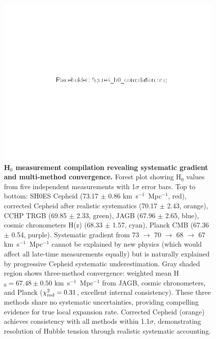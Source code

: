 \documentclass[twocolumn, linenumbers]{aastex701}
\begin{document}
\begin{figure}
\includegraphics[width=\columnwidth]{../figures/figure4_h0_compilation.png}
\caption{\textbf{H$_0$ measurement compilation revealing systematic gradient and multi-method convergence.} Forest plot showing H$_0$ values from five independent measurements with 1$\sigma$ error bars. Top to bottom: SH0ES Cepheid (73.17 $\pm$ 0.86 km~s$^{-1}$~Mpc$^{-1}$, red), corrected Cepheid after realistic systematics (70.17 $\pm$ 2.43, orange), CCHP TRGB (69.85 $\pm$ 2.33, green), JAGB (67.96 $\pm$ 2.65, blue), cosmic chronometers H(z) (68.33 $\pm$ 1.57, cyan), Planck CMB (67.36 $\pm$ 0.54, purple). Systematic gradient from 73 $\rightarrow$ 70 $\rightarrow$ 68 $\rightarrow$ 67 km~s$^{-1}$~Mpc$^{-1}$ cannot be explained by new physics (which would affect all late-time measurements equally) but is naturally explained by progressive Cepheid systematic underestimation. Gray shaded region shows three-method convergence: weighted mean H$_0 = 67.48 \pm 0.50$ km~s$^{-1}$~Mpc$^{-1}$ from JAGB, cosmic chronometers, and Planck ($\chi^2_{\rm red} = 0.31$, excellent internal consistency). These three methods share no systematic uncertainties, providing compelling evidence for true local expansion rate. Corrected Cepheid (orange) achieves consistency with all methods within 1.1$\sigma$, demonstrating resolution of Hubble tension through realistic systematic accounting.}
\label{fig:h0_compilation}
\end{figure}
\end{document}
